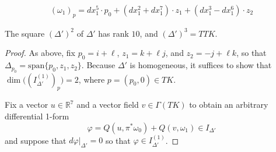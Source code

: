 \documentclass[10pt,a4paper]{amsart}
\begin{document}
    \begin{gather}
        \label{omega_1_p}
        (\omega_1)_p = dx_1^5\cdot p_0 + (dx_1^2+dx_1^7)\cdot z_1 + (dx_1^3-dx_1^6)\cdot z_2
    \end{gather}

\begin{lemma}
    \label{lemma: Delta' growth}
    The square $(\Delta')^2$ of $\Delta'$ has rank $10$, and $(\Delta')^3 = TTK$.
\end{lemma}

\begin{proof}
    As above, fix $p_0 = i + \ell$, $z_1 = k+\ell j$, and $z_2 = -j +\ell k$, so that $\Delta_{p_0} = \mathrm{span}\{p_0,z_1,z_2\}$. Because $\Delta'$ is homogeneous, it suffices to show that $\dim\big((I_{\Delta'}^{(1)})_{p}\big) = 2$, where $p= (p_0,0)\in TK$. 
    
    Fix a vector $u\in \mathbb{R}^7$ and a vector field $v\in \Gamma(TK)$ to obtain an arbitrary differential 1-form
    \begin{equation}
        \label{def varphi}
        \varphi =Q(u,\pi^*\omega_0) +  Q(v, \omega_1) \in I_{\Delta'}
    \end{equation}
    and suppose that $d\varphi|_{\Delta'}=0$ so that $\varphi\in I_{\Delta'}^{(1)}$. 


\end{proof}
\end{document}
